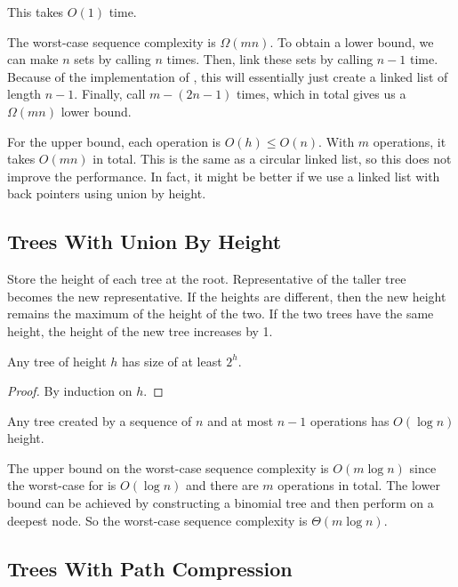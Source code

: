 This takes $O(1)$ time.

The worst-case sequence complexity is $\Omega(mn)$. To obtain a lower bound, we can make $n$ sets by calling  $n$ times. Then, link these sets by calling  $n-1$ time. Because of the implementation of , this will essentially just create a linked list of length $n-1$. Finally, call  $m-(2n-1)$ times, which in total gives us a $\Omega(mn)$ lower bound.

For the upper bound, each operation is $O(h) \leq O(n)$. With $m$ operations, it takes $O(mn)$ in total. This is the same as a circular linked list, so this does not improve the performance. In fact, it might be better if we use a linked list with back pointers using union by height.

\subsection{Trees With Union By Height}

Store the height of each tree at the root. Representative of the taller tree becomes the new representative. If the heights are different, then the new height remains the maximum of the height of the two. If the two trees have the same height, the height of the new tree increases by 1.

\begin{lemma}
    Any tree of height $h$ has size of at least $2^h$.
\end{lemma}

\begin{proof}
    By induction on $h$.
\end{proof}

\begin{corollary}
    Any tree created by a sequence of $n$  and at most $n-1$  operations has $O(\log n)$ height.
\end{corollary}

The upper bound on the worst-case sequence complexity is $O(m \log n)$ since the worst-case for  is $O(\log n)$ and there are $m$ operations in total. The lower bound can be achieved by constructing a binomial tree and then perform  on a deepest node. So the worst-case sequence complexity is $\Theta(m \log n)$.

\subsection{Trees With Path Compression}

